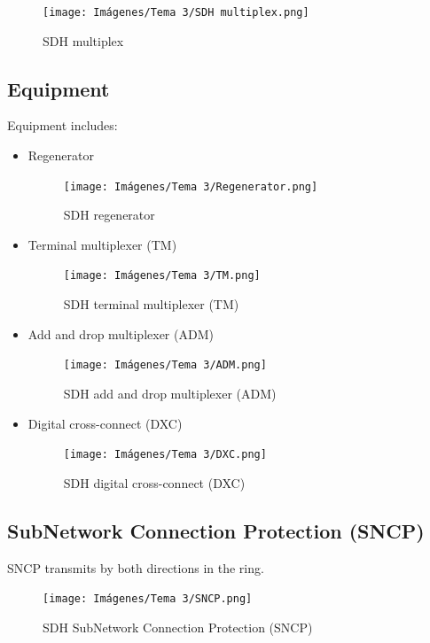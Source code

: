 \documentclass[
	12pt,
	twoside
]{book}
\begin{document}
\begin{figure}[H]
	\centering
	\texttt{[image: Imágenes/Tema 3/SDH multiplex.png]}
	\caption{
		\label{fig:unit3_STM1_multiplex}
		SDH multiplex
	}
\end{figure}

\subsection{Equipment}

Equipment includes:

\begin{itemize}
	\item {
		Regenerator

		\begin{figure}[H]
			\centering
			\texttt{[image: Imágenes/Tema 3/Regenerator.png]}
			\caption{
				\label{fig:unit3_regenerator}
				SDH regenerator
			}
		\end{figure}
	}
	\item {
		Terminal multiplexer (TM)

		\begin{figure}[H]
			\centering
			\texttt{[image: Imágenes/Tema 3/TM.png]}
			\caption{
				\label{fig:unit3_TM}
				SDH terminal multiplexer (TM)
			}
		\end{figure}
	}
	\item {
		Add and drop multiplexer (ADM)

		\begin{figure}[H]
			\centering
			\texttt{[image: Imágenes/Tema 3/ADM.png]}
			\caption{
				\label{fig:unit3_ADM}
				SDH add and drop multiplexer (ADM)
			}
		\end{figure}
	}
	\item {
		Digital cross-connect (DXC)

		\begin{figure}[H]
			\centering
			\texttt{[image: Imágenes/Tema 3/DXC.png]}
			\caption{
				\label{fig:unit3_DXC}
				SDH digital cross-connect (DXC)
			}
		\end{figure}
	}
\end{itemize}

\subsection{SubNetwork Connection Protection (SNCP)}

SNCP transmits by both directions in the ring.

\begin{figure}[H]
	\centering
	\texttt{[image: Imágenes/Tema 3/SNCP.png]}
	\caption{
		\label{fig:unit3_SNCP}
		SDH SubNetwork Connection Protection (SNCP)
	}
\end{figure}
\end{document}
